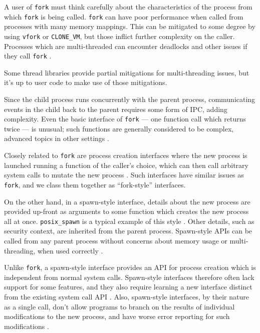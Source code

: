 \documentclass[letterpaper,twocolumn,10pt]{article}
\begin{document}
A user of \texttt{fork} must think carefully about the characteristics of the process
from which \texttt{fork} is being called.
\texttt{fork} can have poor performance when called from processes with many memory mappings\cite{forkroad}.
This can be mitigated to some degree by using \texttt{vfork} or \texttt{CLONE\_VM},
but those inflict further complexity on the caller\cite{vfork_dangerous}.
Processes which are multi-threaded can encounter deadlocks and other issues if they call \texttt{fork}
\cite{forkroad}\cite{tlpi}\cite{posix_spawn_error_pipe}.

Some thread libraries provide partial mitigations for multi-threading issues,
but it's up to user code to make use of those mitigations\cite{pthread_atfork}.

Since the child process runs concurrently with the parent process,
communicating events in the child back to the parent requires some form of IPC,
adding complexity\cite{posix_spawn_error_pipe}.
Even the basic interface of \texttt{fork} --- one function call which returns twice --- is unusual;
such functions are generally considered to be complex, advanced topics in other settings
\cite{callcc_fork}\cite{continuations}.

Closely related to \texttt{fork}
are process creation interfaces where the new process is launched running a function of the caller's choice,
which can then call arbitrary system calls to mutate the new process
\cite{clone}\cite{sfork}.
Such interfaces have similar issues as \texttt{fork},
and we class them together as ``fork-style'' interfaces.

On the other hand, in a spawn-style interface,
details about the new process are provided up-front as arguments to some function
which creates the new process all at once.
\texttt{posix\_spawn} is a typical example of this style
\cite{posix_spawn}\cite{create_process}\cite{chainloading}.
Other details, such as security context, are inherited from the parent process\cite{tlpi}\cite{create_process}.
Spawn-style APIs
can be called from any parent process without concerns about memory usage or multi-threading,
when used correctly
\cite{forkroad}\cite{posix_spawn_error_pipe}.

Unlike \texttt{fork}, a spawn-style interface provides an API for process creation
which is independent from normal system calls\cite{spawn_h}\cite{subprocess_run}.
Spawn-style interfaces therefore often lack support for some features,
and they also require learning a new interface distinct from the existing system call API
\cite{tlpi}\cite{posix_spawn_lwn}.
Also, spawn-style interfaces, by their nature as a single call,
don't allow programs to branch on the results of individual modifications to the new process,
and have worse error reporting for such modifications
\cite{posix_spawn}\cite{posix_spawn_error_pipe}.
\end{document}
